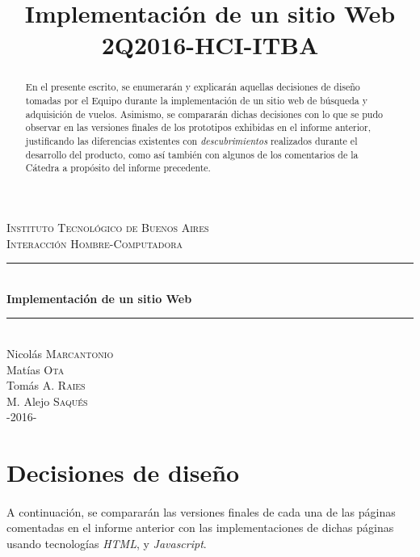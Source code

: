 \documentclass[spanish]{article}
\title{Implementación de un sitio Web \\ 2Q2016-HCI-ITBA}
\date{}
\author{}
\begin{document}
	

	\begin{titlepage}
		
		\newcommand{\HRule}{\rule{\linewidth}{0.5mm}} 
		
		\center 
		

		
		\textsc{\LARGE Instituto Tecnológico de Buenos Aires}\\[1.5cm] 
		\textsc{\Large Interacción Hombre-Computadora}\\[0.5cm] 
		

		
		\HRule \\[0.4cm]
		{ \huge \bfseries Implementación de un sitio Web}\\[0.4cm] %
		\HRule \\[1.5cm]
		
		
		\Large 
		Nicolás \textsc{Marcantonio}\\[.5cm] 
		Matías \textsc{Ota}\\[.5cm]
		Tomás A. \textsc{Raies}\\[.5cm]
		M. Alejo \textsc{Saqués}\\[4cm]
		\textsc{-2016-}
		
		\vfill 
		
	\end{titlepage}
	
	\tableofcontents
	\newpage
	\maketitle
	\begin{abstract}
		En el presente escrito, se enumerarán y explicarán aquellas decisiones de diseño tomadas por el Equipo durante la implementación de un sitio web de búsqueda y adquisición de vuelos. Asimismo, se compararán dichas decisiones con lo que se pudo observar en las versiones finales de los prototipos exhibidas en el informe anterior, justificando las diferencias existentes con \textit{descubrimientos} realizados durante el desarrollo del producto, como así también con algunos de los comentarios de la Cátedra a propósito del informe precedente.
	\end{abstract}
	\newpage
	
	\section{Decisiones de diseño}
	\paragraph{}A continuación, se compararán las versiones finales de cada una de las páginas comentadas en el informe anterior con las implementaciones de dichas páginas usando tecnologías \textit{HTML},  y \textit{Javascript}.
\end{document}
